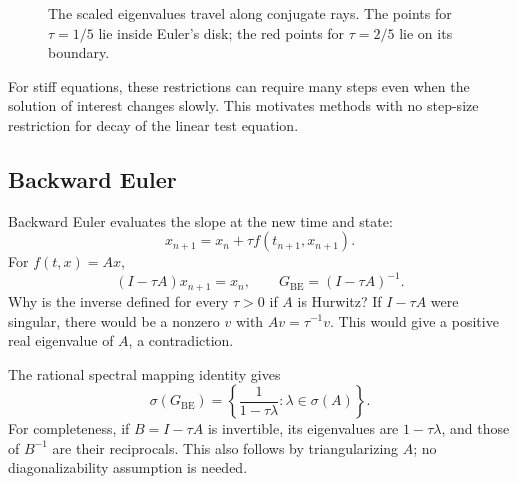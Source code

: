 \begin{figure}[htbp]
\centering
{}
\caption{The scaled eigenvalues travel along conjugate rays. The
points for \(\tau=1/5\) lie inside Euler's disk; the red points for
\(\tau=2/5\) lie on its boundary.}
\end{figure}

For stiff equations, these restrictions can require many steps even
when the solution of interest changes slowly. This motivates methods
with no step-size restriction for decay of the linear test equation.

\subsection{Backward Euler}

Backward Euler evaluates the slope at the new time and state:
\begin{equation}\label{eq:backward-euler-sep-18}
 x_{n+1}=x_n+\tau f(t_{n+1},x_{n+1}).
\end{equation}
For \(f(t,x)=Ax\),
\[
 (I-\tau A)x_{n+1}=x_n,
 \qquad G_{\mathrm{BE}}=(I-\tau A)^{-1}.
\]
Why is the inverse defined for every \(\tau>0\) if \(A\) is Hurwitz?
If \(I-\tau A\) were singular, there would be a nonzero \(v\) with
\(Av=\tau^{-1}v\). This would give a positive real eigenvalue of
\(A\), a contradiction.

The rational spectral mapping identity gives
\begin{equation}\label{eq:be-spectral-mapping-sep-18}
 \sigma(G_{\mathrm{BE}})
   =\left\{\frac{1}{1-\tau\lambda}:\lambda\in\sigma(A)\right\}.
\end{equation}
For completeness, if \(B=I-\tau A\) is invertible, its eigenvalues
are \(1-\tau\lambda\), and those of \(B^{-1}\) are their reciprocals.
This also follows by triangularizing \(A\); no diagonalizability
assumption is needed.

